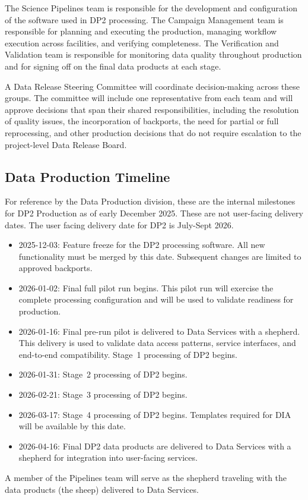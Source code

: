 The Science Pipelines team is responsible for the development and configuration of the software used in DP2 processing.
The Campaign Management team is responsible for planning and executing the production, managing workflow execution across facilities, and verifying completeness.
The Verification and Validation team is responsible for monitoring data quality throughout production and for signing off on the final data products at each stage.

A Data Release Steering Committee will coordinate decision-making across these groups.
The committee will include one representative from each team and will approve decisions that span their shared responsibilities, including the resolution of quality issues, the incorporation of backports, the need for partial or full reprocessing, and other production decisions that do not require escalation to the project-level Data Release Board.


\subsection{Data Production Timeline}

For reference by the Data Production division,
these are the internal milestones for DP2 Production as of early December 2025.
These are not user-facing delivery dates.
The user facing delivery date for DP2 is July-Sept 2026.

\begin{itemize}

\item 2025-12-03: Feature freeze for the DP2 processing software.
All new functionality must be merged by this date.
Subsequent changes are limited to approved backports.

\item 2026-01-02: Final full pilot run begins.
This pilot run will exercise the complete processing configuration and will be used to validate readiness for production.

\item 2026-01-16: Final pre-run pilot is delivered to Data Services with a shepherd.
This delivery is used to validate data access patterns, service interfaces, and end-to-end compatibility.
Stage~1 processing of DP2 begins.

\item 2026-01-31: Stage~2 processing of DP2 begins.

\item 2026-02-21: Stage~3 processing of DP2 begins.

\item 2026-03-17: Stage~4 processing of DP2 begins. Templates required for DIA will be available by this date.

\item 2026-04-16: Final DP2 data products are delivered to Data Services with a shepherd for integration into user-facing services.

\end{itemize}

A member of the Pipelines team will serve as the shepherd traveling with the data products (the sheep) delivered to Data Services.
